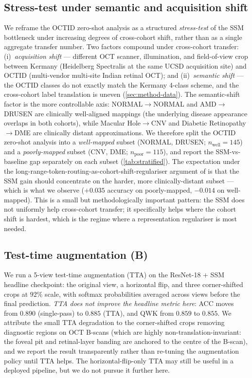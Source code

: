 \documentclass[5p]{elsarticle}
\begin{document}
\subsection{Stress-test under semantic and acquisition shift}
\label{sec:stratified}
We reframe the OCTID zero-shot analysis as a structured \emph{stress-test} of the SSM bottleneck under increasing degrees of cross-cohort shift, rather than as a single aggregate transfer number. Two factors compound under cross-cohort transfer: (i)~\emph{acquisition shift} --- different OCT scanner, illumination, and field-of-view crop between Kermany (Heidelberg Spectralis at the same UCSD acquisition site) and OCTID (multi-vendor multi-site Indian retinal OCT); and (ii)~\emph{semantic shift} --- the OCTID classes do not exactly match the Kermany 4-class scheme, and the cross-cohort label translation is uneven (\cref{sec:method-data}). The semantic-shift factor is the more controllable axis: NORMAL$\rightarrow$NORMAL and AMD$\rightarrow$DRUSEN are clinically well-aligned mappings (the underlying disease appearance overlaps in both cohorts), while Macular Hole$\rightarrow$CNV and Diabetic Retinopathy$\rightarrow$DME are clinically distant approximations. We therefore split the OCTID zero-shot analysis into a \emph{well-mapped} subset (NORMAL, DRUSEN; $n_{\text{well}}=145$) and a \emph{poorly-mapped} subset (CNV, DME; $n_{\text{poor}}=115$), and report the SSM-vs-baseline gap separately on each subset (\cref{tab:stratified}). The expectation under the long-range-token-routing-as-cohort-shift-regulariser argument of  is that the SSM gain should concentrate on the harder, more clinically-distant subset --- which is what we observe ($+0.035$ accuracy on poorly-mapped, $-0.014$ on well-mapped). This is a small but methodologically important pattern: the SSM does not uniformly help cross-cohort transfer; it specifically helps where the cohort shift is hardest, which is the regime where a representation regulariser is most needed.

\subsection{Test-time augmentation (B)}
\label{sec:tta}
We run a 5-view test-time augmentation (TTA) on the ResNet-18 + SSM headline checkpoint: the original view, a horizontal flip, and three corner-shifted crops at $92\%$ scale, with softmax probabilities averaged across views before the final prediction. \emph{TTA does not improve the headline metric here}: ACC moves from $0.890$ (single-pass) to $0.885$ (TTA), and QWK from $0.859$ to $0.855$. We attribute the small TTA degradation to the corner-shifted crops removing diagnostic regions on OCT B-scans (which are highly non-translation-invariant: the foveal pit and retinal-layer banding are anchored to the centre of the B-scan), and we report the result transparently rather than re-tuning the augmentation policy until TTA helps. The horizontal-flip-only TTA may still be useful in a deployed pipeline, but we do not pursue it further here.
\end{document}
